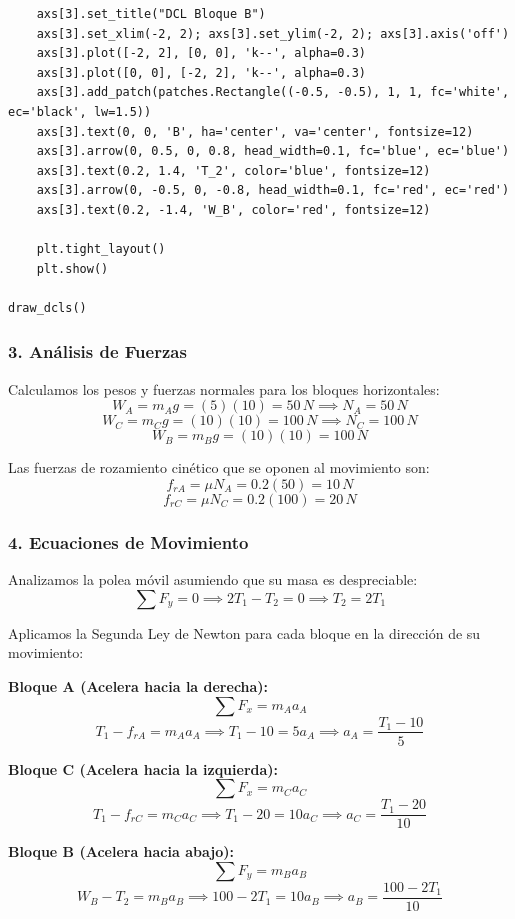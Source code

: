 \documentclass[12pt, a4paper]{article}
\begin{document}
\begin{lstlisting}
    axs[3].set_title("DCL Bloque B")
    axs[3].set_xlim(-2, 2); axs[3].set_ylim(-2, 2); axs[3].axis('off')
    axs[3].plot([-2, 2], [0, 0], 'k--', alpha=0.3)
    axs[3].plot([0, 0], [-2, 2], 'k--', alpha=0.3)
    axs[3].add_patch(patches.Rectangle((-0.5, -0.5), 1, 1, fc='white', ec='black', lw=1.5))
    axs[3].text(0, 0, 'B', ha='center', va='center', fontsize=12)
    axs[3].arrow(0, 0.5, 0, 0.8, head_width=0.1, fc='blue', ec='blue')
    axs[3].text(0.2, 1.4, 'T_2', color='blue', fontsize=12)
    axs[3].arrow(0, -0.5, 0, -0.8, head_width=0.1, fc='red', ec='red')
    axs[3].text(0.2, -1.4, 'W_B', color='red', fontsize=12)

    plt.tight_layout()
    plt.show()

draw_dcls()
\end{lstlisting}

\subsubsection*{3. Análisis de Fuerzas}
Calculamos los pesos y fuerzas normales para los bloques horizontales:
$$ W_A = m_A g = (5)(10) = 50\,\si{N} \implies N_A = 50\,\si{N} $$
$$ W_C = m_C g = (10)(10) = 100\,\si{N} \implies N_C = 100\,\si{N} $$
$$ W_B = m_B g = (10)(10) = 100\,\si{N} $$

Las fuerzas de rozamiento cinético que se oponen al movimiento son:
$$ f_{rA} = \mu N_A = 0.2(50) = 10\,\si{N} $$
$$ f_{rC} = \mu N_C = 0.2(100) = 20\,\si{N} $$

\subsubsection*{4. Ecuaciones de Movimiento}
Analizamos la polea móvil asumiendo que su masa es despreciable:
$$ \sum F_y = 0 \implies 2 T_1 - T_2 = 0 \implies T_2 = 2 T_1 $$

Aplicamos la Segunda Ley de Newton para cada bloque en la dirección de su movimiento:

\textbf{Bloque A (Acelera hacia la derecha):}
$$ \sum F_x = m_A a_A $$
$$ T_1 - f_{rA} = m_A a_A \implies T_1 - 10 = 5 a_A \implies a_A = \frac{T_1 - 10}{5} $$

\textbf{Bloque C (Acelera hacia la izquierda):}
$$ \sum F_x = m_C a_C $$
$$ T_1 - f_{rC} = m_C a_C \implies T_1 - 20 = 10 a_C \implies a_C = \frac{T_1 - 20}{10} $$

\textbf{Bloque B (Acelera hacia abajo):}
$$ \sum F_y = m_B a_B $$
$$ W_B - T_2 = m_B a_B \implies 100 - 2 T_1 = 10 a_B \implies a_B = \frac{100 - 2 T_1}{10} $$
\end{document}
